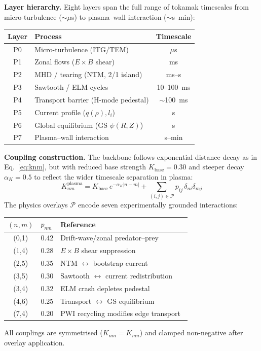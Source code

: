 \documentclass[twocolumn,preprintnumbers,amsmath,amssymb,prl,floatfix]{revtex4-2}
\begin{document}
\textbf{Layer hierarchy.}\quad
Eight layers span the full range of tokamak timescales from
micro-turbulence (${\sim}\mu$s) to plasma--wall interaction
(${\sim}$s--min):
%
\begin{center}
\begin{tabular}{clc}
\toprule
Layer & Process & Timescale \\
\midrule
P0 & Micro-turbulence (ITG/TEM) & $\mu$s \\
P1 & Zonal flows ($E{\times}B$ shear) & ms \\
P2 & MHD / tearing (NTM, 2/1 island) & ms--s \\
P3 & Sawtooth / ELM cycles & 10--100~ms \\
P4 & Transport barrier (H-mode pedestal) & $\sim$100~ms \\
P5 & Current profile ($q(\rho), l_i$) & s \\
P6 & Global equilibrium (GS $\psi(R,Z)$) & s \\
P7 & Plasma--wall interaction & s--min \\
\bottomrule
\end{tabular}
\end{center}

\textbf{Coupling construction.}\quad
The backbone follows exponential distance decay as in
Eq.~\eqref{eq:knm}, but with reduced base strength
$K_\mathrm{base} = 0.30$ and steeper decay $\alpha_K = 0.5$
to reflect the wider timescale separation in plasma:
%
\begin{equation}
  K_{nm}^\mathrm{plasma} = K_\mathrm{base}\, e^{-\alpha_K |n-m|}
  + \sum_{(i,j)\in\mathcal{P}} p_{ij}\,\delta_{ni}\delta_{mj}
  \label{eq:plasma_knm}
\end{equation}
%
The physics overlays $\mathcal{P}$ encode seven experimentally
grounded interactions:
%
\begin{center}
\begin{tabular}{cll}
\toprule
$(n,m)$ & $p_{nm}$ & Reference \\
\midrule
(0,1) & 0.42 & Drift-wave/zonal predator--prey~\cite{diamond2005} \\
(1,4) & 0.28 & $E{\times}B$ shear suppression~\cite{terry2000} \\
(2,5) & 0.35 & NTM $\leftrightarrow$ bootstrap current~\cite{lahaye2006} \\
(3,5) & 0.30 & Sawtooth $\leftrightarrow$ current redistribution~\cite{porcelli1996} \\
(3,4) & 0.32 & ELM crash depletes pedestal \\
(4,6) & 0.25 & Transport $\leftrightarrow$ GS equilibrium~\cite{lutjens1996} \\
(7,4) & 0.20 & PWI recycling modifies edge transport~\cite{stangeby2000} \\
\bottomrule
\end{tabular}
\end{center}
%
All couplings are symmetrised ($K_{nm} = K_{mn}$) and clamped
non-negative after overlay application.
\end{document}

